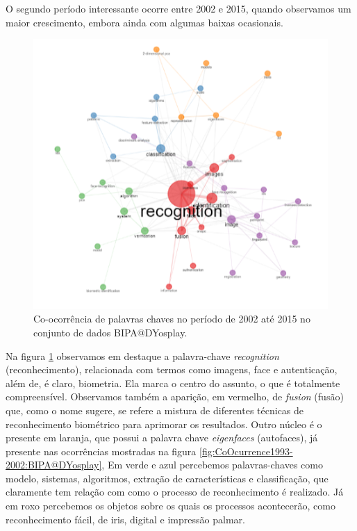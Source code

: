 O segundo período interessante ocorre entre 2002 e 2015, quando observamos um maior crescimento, embora ainda com algumas baixas ocasionais.

\begin{figure}[H]
    \centering
    \includegraphics[width=1\textwidth]{experiments/DYosplay/PesquisaBibliometrica/Imagens/BIPA@DYosplay_CoOcurrenceNetwork2002-2015.png}
    \caption{Co-ocorrência de palavras chaves no período de 2002 até 2015 no conjunto de dados BIPA@DYosplay.}
    \label{fig:CoOcurrence2002-2015:BIPA@DYosplay}
\end{figure}

Na figura \ref{fig:CoOcurrence2002-2015:BIPA@DYosplay} observamos em destaque a palavra-chave \textit{recognition} (reconhecimento), relacionada com termos como imagens, face e autenticação, além de, é claro, biometria. Ela marca o centro do assunto, o que é totalmente compreensível. Observamos também a aparição, em vermelho, de \textit{fusion} (fusão) que, como o nome sugere, se refere a mistura de diferentes técnicas de reconhecimento biométrico para aprimorar os resultados. Outro núcleo é o presente em laranja, que possui a palavra chave \textit{eigenfaces} (autofaces), já presente nas ocorrências mostradas na figura \ref{fig:CoOcurrence1993-2002:BIPA@DYosplay}, Em verde e azul percebemos palavras-chaves como modelo, sistemas, algoritmos, extração de características e classificação, que claramente tem relação com como o processo de reconhecimento é realizado. Já em roxo percebemos os objetos sobre os quais os processos acontecerão, como reconhecimento fácil, de iris, digital e impressão palmar.

